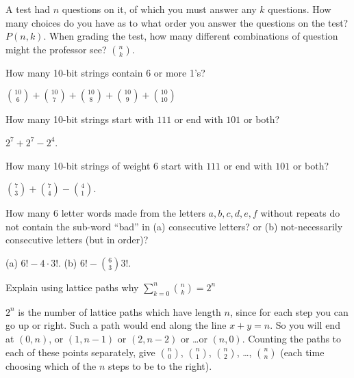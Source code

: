 \begin{squestions}
	\begin{answer}
		 A test had $n$ questions on it, of which you must answer any $k$ questions.  How many choices do you have as to what order you answer the questions on the test?  $P(n,k)$.  When grading the test, how many different combinations of question might the professor see?  ${n \choose k}$.
	\end{answer}
	
	


\question How many 10-bit strings contain 6 or more 1's?

	\begin{answer}
		${10 \choose 6} + {10 \choose 7} + {10 \choose 8} + {10 \choose 9} + {10 \choose 10}$ 
	\end{answer}
	
	


\question How many 10-bit strings start with $111$ or end with $101$ or both?

	\begin{answer}
		 $2^7 + 2^7 - 2^4$.
	\end{answer}
	
	


\question How many 10-bit strings of weight 6 start with $111$ or end with $101$ or both?

	\begin{answer}
		${7 \choose 3} + {7 \choose 4} - {4 \choose 1}$.
	\end{answer}
	
	


\question How many 6 letter words made from the letters $a,b,c,d,e,f$ without repeats do not contain the sub-word ``bad'' in (a) consecutive letters? or (b) not-necessarily consecutive letters (but in order)? 

	\begin{answer}
		(a) $6! - 4\cdot 3!$.  (b) $6! - {6 \choose 3}3!$.
	\end{answer}
	
	


\question Explain using lattice paths why $\sum_{k=0}^n {n \choose k} = 2^n$

	\begin{answer}
		$2^n$ is the number of lattice paths which have length $n$, since for each step you can go up or right.  Such a path would end along the line $x + y = n$.  So you will end at $(0,n)$, or $(1,n-1)$ or $(2, n-2)$ or \ldots or $(n,0)$.  Counting the paths to each of these points separately, give ${n \choose 0}$, ${n \choose 1}$, ${n \choose 2}$, \ldots, ${n \choose n}$ (each time choosing which of the $n$ steps to be to the right).
	\end{answer}
	

\end{squestions}
